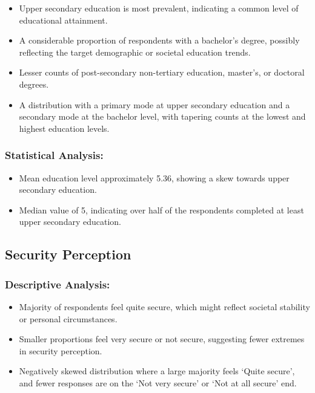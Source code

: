 \documentclass[
]{article}
\providecommand{\tightlist}{%
  \setlength{\itemsep}{0pt}\setlength{\parskip}{0pt}}
\begin{document}
\begin{itemize}
\tightlist
\item
  Upper secondary education is most prevalent, indicating a common level
  of educational attainment.
\item
  A considerable proportion of respondents with a bachelor's degree,
  possibly reflecting the target demographic or societal education
  trends.
\item
  Lesser counts of post-secondary non-tertiary education, master's, or
  doctoral degrees.
\item
  A distribution with a primary mode at upper secondary education and a
  secondary mode at the bachelor level, with tapering counts at the
  lowest and highest education levels.
\end{itemize}

\hypertarget{statistical-analysis-1}{%
\subsubsection{Statistical Analysis:}\label{statistical-analysis-1}}

\begin{itemize}
\tightlist
\item
  Mean education level approximately 5.36, showing a skew towards upper
  secondary education.
\item
  Median value of 5, indicating over half of the respondents completed
  at least upper secondary education.
\end{itemize}

\hypertarget{security-perception}{%
\subsection{Security Perception}\label{security-perception}}

\hypertarget{descriptive-analysis-2}{%
\subsubsection{Descriptive Analysis:}\label{descriptive-analysis-2}}

\begin{itemize}
\tightlist
\item
  Majority of respondents feel quite secure, which might reflect
  societal stability or personal circumstances.
\item
  Smaller proportions feel very secure or not secure, suggesting fewer
  extremes in security perception.
\item
  Negatively skewed distribution where a large majority feels `Quite
  secure', and fewer responses are on the `Not very secure' or `Not at
  all secure' end.
\end{itemize}
\end{document}
